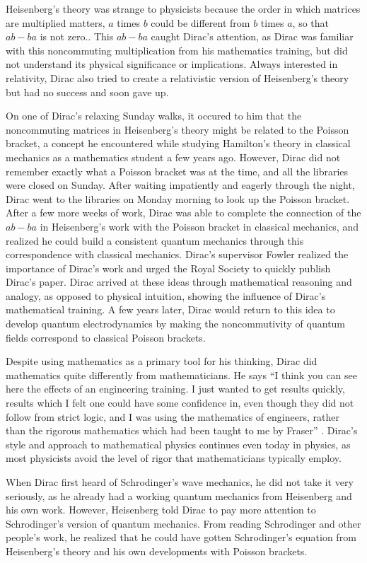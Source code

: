 \documentclass[12pt, oneside, letterpaper, fleqn]{article}
\begin{document}
Heisenberg's theory was strange to physicists because the order in which
matrices are multiplied matters, $a$ times $b$ could be different from
$b$ times $a$, so that $ab - ba$ is not zero..  This $ab - ba$ caught
Dirac's attention, as Dirac was familiar with this noncommuting
multiplication from his mathematics training, but did not understand its
physical significance or implications. Always interested in relativity,
Dirac also tried to create a relativistic version of Heisenberg's theory
but had no success and soon gave up.

On one of Dirac's relaxing Sunday walks, it occured to him that the
noncommuting matrices in Heisenberg's theory might be related to the
Poisson bracket, a concept he encountered while studying Hamilton's
theory in classical mechanics as a mathematics student a few years ago.
However, Dirac did not remember exactly what a Poisson bracket was at
the time, and all the libraries were closed on Sunday. After waiting
impatiently and eagerly through the night, Dirac went to the libraries
on Monday morning to look up the Poisson bracket. After a few more weeks
of work, Dirac was able to complete the connection of the $ab - ba$ in
Heisenberg's work with the Poisson bracket in classical mechanics, and
realized he could build a consistent quantum mechanics through this
correspondence with classical mechanics. Dirac's supervisor Fowler
realized the importance of Dirac's work and urged the Royal Society to
quickly publish Dirac's paper. Dirac arrived at these ideas through
mathematical reasoning and analogy, as opposed to physical intuition,
showing the influence of Dirac's mathematical training. A few years
later, Dirac would return to this idea to develop quantum
electrodynamics by making the noncommutivity of quantum fields
correspond to classical Poisson brackets.

Despite using mathematics as a primary tool for his thinking, Dirac did
mathematics quite differently from mathematicians. He says ``I think you
can see here the effects of an engineering training. I just wanted to
get results quickly, results which I felt one could have some confidence
in, even though they did not follow from strict logic, and I was using
the mathematics of engineers, rather than the rigorous mathematics which
had been taught to me by Fraser'' \cite[pg. 95]{strangest_man}. Dirac's
style and approach to mathematical physics continues even today in
physics, as most physicists avoid the level of rigor that mathematicians
typically employ.

When Dirac first heard of Schrodinger's wave mechanics, he did not take
it very seriously, as he already had a working quantum mechanics from
Heisenberg and his own work. However, Heisenberg told Dirac to pay more
attention to Schrodinger's version of quantum mechanics. From reading
Schrodinger and other people's work, he realized that he could have
gotten Schrodinger's equation from Heisenberg's theory and his own
developments with Poisson brackets.
\end{document}

